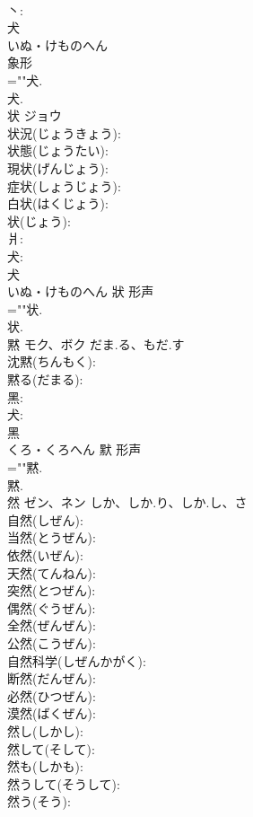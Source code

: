 \documentclass[8pt]{extreport}
\begin{document}
\begin{CJK}{UTF8}{min}
\\	丶: 
\\	犬	
\\	いぬ・けものへん	
\\	象形 
\\	=""犬.
\\	犬.
\\	状	ジョウ			
\\	状況(じょうきょう): 
\\	状態(じょうたい): 
\\	現状(げんじょう): 
\\	症状(しょうじょう): 
\\	白状(はくじょう): 
\\	状(じょう): 
\\	爿: 
\\	犬: 
\\	犬	
\\	いぬ・けものへん	狀	形声 
\\	=""状.
\\	状.
\\	黙	モク、ボク	だま.る、もだ.す		
\\	沈黙(ちんもく): 
\\	黙る(だまる): 
\\	黑: 
\\	犬: 
\\	黑	
\\	くろ・くろへん	默	形声 
\\	=""黙.
\\	黙.
\\	然	ゼン、ネン	しか、しか.り、しか.し、さ		
\\	自然(しぜん): 
\\	当然(とうぜん): 
\\	依然(いぜん): 
\\	天然(てんねん): 
\\	突然(とつぜん): 
\\	偶然(ぐうぜん): 
\\	全然(ぜんぜん): 
\\	公然(こうぜん): 
\\	自然科学(しぜんかがく): 
\\	断然(だんぜん): 
\\	必然(ひつぜん): 
\\	漠然(ばくぜん): 
\\	然し(しかし): 
\\	然して(そして): 
\\	然も(しかも): 
\\	然うして(そうして): 
\\	然う(そう): 

\end{CJK}
\end{document}
